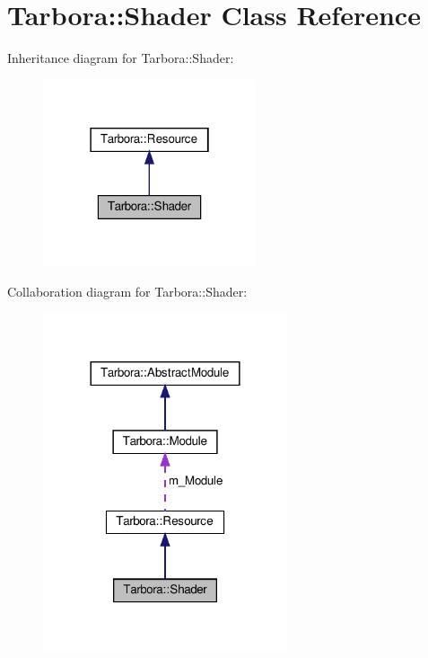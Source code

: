 \hypertarget{classTarbora_1_1Shader}{}\section{Tarbora\+:\+:Shader Class Reference}
\label{classTarbora_1_1Shader}


Inheritance diagram for Tarbora\+:\+:Shader\+:\nopagebreak
\begin{figure}[H]
\begin{center}
\leavevmode
\includegraphics[width=178pt]{classTarbora_1_1Shader__inherit__graph}
\end{center}
\end{figure}


Collaboration diagram for Tarbora\+:\+:Shader\+:
\nopagebreak
\begin{figure}[H]
\begin{center}
\leavevmode
\includegraphics[width=204pt]{classTarbora_1_1Shader__coll__graph}
\end{center}
\end{figure}
